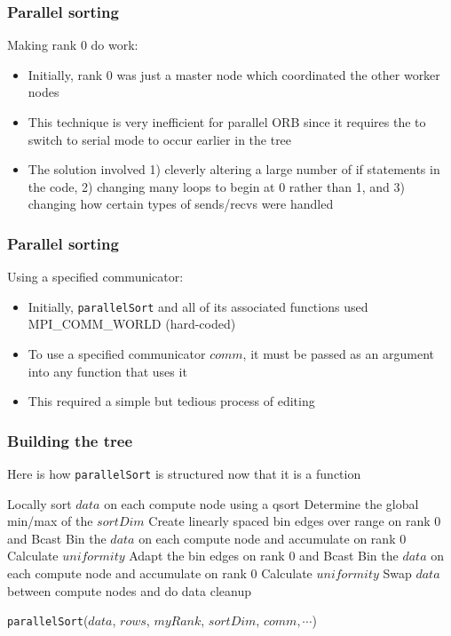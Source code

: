 \documentclass[usernames,dvipsnames]{beamer}
\begin{document}
\begin{frame}
	\frametitle{Parallel sorting}
	
	\begin{block}{Making rank 0 do work:}
		\begin{itemize}
			\item Initially, rank 0 was just a master node which coordinated the other worker nodes
			\item This technique is very inefficient for parallel ORB since it requires the to switch to serial mode to occur earlier in the tree
			\item The solution involved 1) cleverly altering a large number of if statements in the code, 2) changing many loops to begin at 0 rather than 1, and 3) changing how certain types of sends/recvs were handled
		\end{itemize}
	\end{block}
\end{frame}

\begin{frame}
	\frametitle{Parallel sorting}
	
	\begin{block}{Using a specified communicator:}
		\begin{itemize}
			\item Initially, \texttt{parallelSort} and all of its associated functions used MPI\_COMM\_WORLD (hard-coded)
			\item To use a specified communicator $comm$, it must be passed as an argument into any function that uses it
			\item This required a simple but tedious process of editing
		\end{itemize}
	\end{block}
\end{frame}

\begin{frame}
	\frametitle{Building the tree}
	
	Here is how \texttt{parallelSort} is structured now that it is a function
	
	\vspace{10pt}
	
	\begin{algorithm}[H]
		\begin{algorithmic}[1]
			\STATE Locally sort $data$ on each compute node using a qsort
			\STATE Determine the global min/max of the $sortDim$
			\STATE Create linearly spaced bin edges over range on rank 0 and Bcast
			\STATE Bin the $data$ on each compute node and accumulate on rank 0
			\STATE Calculate $uniformity$
				\STATE Adapt the bin edges on rank 0 and Bcast
				\STATE Bin the $data$ on each compute node and accumulate on rank 0
				\STATE Calculate $uniformity$
			\ENDWHILE
			\STATE Swap $data$ between compute nodes and do data cleanup
		\end{algorithmic}
		\caption{\texttt{parallelSort}($data$, $rows$, $myRank$, $sortDim$, $comm, \cdots$)}
	\end{algorithm}
		
\end{frame}
\end{document}
